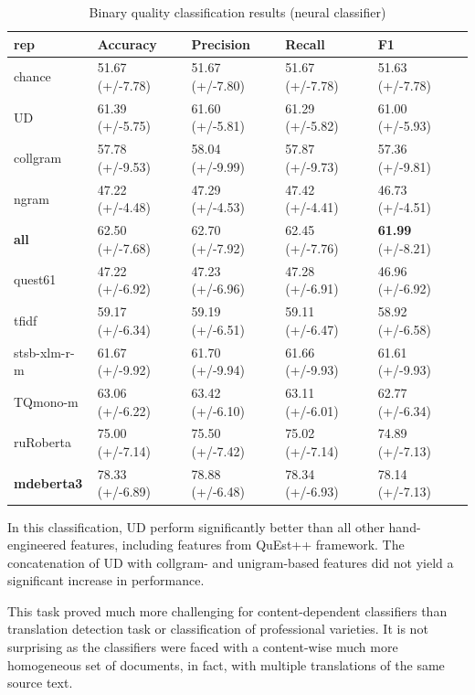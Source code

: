 \begin{table}[H]
	\centering
	\begin{tabular}{l|llll}
		\toprule
		rep      & Accuracy         & Precision        & Recall           & F1               \\
		\midrule
		chance          & 51.67 (+/-7.78) & 51.67 (+/-7.80) & 51.67 (+/-7.78) & 51.63 (+/-7.78) \\
		\midrule
		UD              & 61.39 (+/-5.75) & 61.60 (+/-5.81) & 61.29 (+/-5.82) & 61.00 (+/-5.93) \\
		collgram        & 57.78 (+/-9.53) & 58.04 (+/-9.99) & 57.87 (+/-9.73) & 57.36 (+/-9.81) \\
		ngram           & 47.22 (+/-4.48) & 47.29 (+/-4.53) & 47.42 (+/-4.41) & 46.73 (+/-4.51) \\
		\textbf{all}             & 62.50 (+/-7.68) & 62.70 (+/-7.92) & 62.45 (+/-7.76) & \textbf{61.99} (+/-8.21) \\
		\midrule
		quest61         & 47.22 (+/-6.92) & 47.23 (+/-6.96) & 47.28 (+/-6.91) & 46.96 (+/-6.92) \\
		\midrule
		tfidf           & 59.17 (+/-6.34) & 59.19 (+/-6.51) & 59.11 (+/-6.47) & 58.92 (+/-6.58) \\
		stsb-xlm-r-m          & 61.67 (+/-9.92) & 61.70 (+/-9.94) & 61.66 (+/-9.93) & 61.61 (+/-9.93) \\
		TQmono-m        & 63.06 (+/-6.22) & 63.42 (+/-6.10) & 63.11 (+/-6.01) & 62.77 (+/-6.34) \\
		ruRoberta & 75.00 (+/-7.14) & 75.50 (+/-7.42) & 75.02 (+/-7.14) & 74.89 (+/-7.13) \\
		\textbf{mdeberta3}  & 78.33 (+/-6.89) & 78.88 (+/-6.48) & 78.34 (+/-6.93) & \boxit{0.4in}78.14 (+/-7.13)\\
		\bottomrule
	\end{tabular}
	\caption{\label{tab:bad-good}Binary quality classification results (neural classifier)}
\end{table}

In this classification, UD perform significantly better than all other hand-engineered features, including features from QuEst++ framework. The concatenation of UD with collgram- and unigram-based features did not yield a significant increase in performance. 

This task proved much more challenging for content-dependent classifiers than translation detection task or classification of professional varieties. It is not surprising as the classifiers were faced with a content-wise much more homogeneous set of documents, in fact, with multiple translations of the same source text. 

